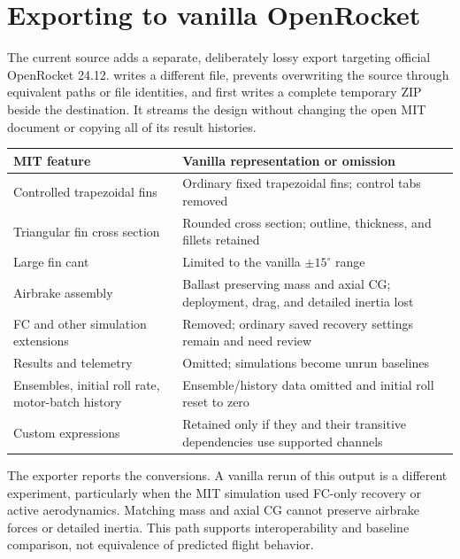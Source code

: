 


\section{Exporting to vanilla OpenRocket}
The current source adds a separate, deliberately lossy export targeting official OpenRocket 24.12.  writes a different file, prevents overwriting the source through equivalent paths or file identities, and first writes a complete temporary ZIP beside the destination. It streams the design without changing the open MIT document or copying all of its result histories.

\begin{tabularx}{\linewidth}{@{}L{4.2cm}Y@{}}\toprule
MIT feature & Vanilla representation or omission\\\midrule
Controlled trapezoidal fins & Ordinary fixed trapezoidal fins; control tabs removed\\
Triangular fin cross section & Rounded cross section; outline, thickness, and fillets retained\\
Large fin cant & Limited to the vanilla $\pm15^\circ$ range\\
Airbrake assembly & Ballast preserving mass and axial CG; deployment, drag, and detailed inertia lost\\
FC and other simulation extensions & Removed; ordinary saved recovery settings remain and need review\\
Results and telemetry & Omitted; simulations become unrun baselines\\
Ensembles, initial roll rate, motor-batch history & Ensemble/history data omitted and initial roll reset to zero\\
Custom expressions & Retained only if they and their transitive dependencies use supported channels\\\bottomrule
\end{tabularx}

The exporter reports the conversions. A vanilla rerun of this output is a different experiment, particularly when the MIT simulation used FC-only recovery or active aerodynamics. Matching mass and axial CG cannot preserve airbrake forces or detailed inertia. This path supports interoperability and baseline comparison, not equivalence of predicted flight behavior.

